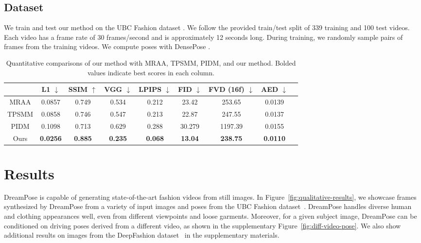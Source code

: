     \subsection{Dataset}

    We train and test our method on the UBC Fashion dataset \cite{ubc_fashion}. We follow the provided train/test split of 339 training and 100 test videos. Each video has a frame rate of 30 frames/second and is approximately 12 seconds long. During training, we randomly sample pairs of frames from the training videos. We compute poses with DensePose \cite{densepose}.
        

        \begin{table*}[h!]
        \begin{center}
        \begin{tabular}{c c c c c c c c c}
        \hline
        & L1 $\downarrow$ & SSIM $\uparrow$ & VGG  $\downarrow$ & LPIPS  $\downarrow$ & FID $\downarrow$ & FVD (16f) $\downarrow$ & AED $\downarrow$ \\
        \hline\hline
        MRAA \cite{articulated_animation} &  0.0857 &  0.749 & 0.534 & 0.212 & 23.42 & 253.65 & 0.0139  \\
        TPSMM \cite{thin_plate_spline}  &  0.0858 & 0.746 & 0.547 & 0.213 & 22.87 & 247.55 & 0.0137 \\
        PIDM \cite{pose-transfer-dm} & 0.1098 & 0.713 & 0.629 & 0.288 & 30.279 & 1197.39 & 0.0155 \\
        Ours & \textbf{0.0256} & \textbf{0.885} & \textbf{0.235} & \textbf{0.068} & \textbf{13.04} & \textbf{238.75} & \textbf{0.0110}  \\
        \hline
        \end{tabular}
        \end{center}
        \caption{Quantitative comparisons of our method with MRAA, TPSMM, PIDM, and our method. Bolded values indicate best scores in each column. %
        }
        \label{quantitative-comparison}
        \end{table*}
\section{Results}
    DreamPose is capable of generating state-of-the-art fashion videos from still images. In Figure~\ref{fig:qualitative-results}, we showcase frames synthesized by DreamPose from a variety of input images and poses from the UBC Fashion dataset~\cite{ubc_fashion}. DreamPose handles diverse human and clothing appearances well, even from different viewpoints and loose garments. Moreover, for a given subject image, DreamPose can be conditioned on driving poses derived from a different video, as shown in the supplementary Figure~\ref{fig:diff-video-pose}. We also show additional results on images from the DeepFashion dataset~\cite{deep-fashion} in the supplementary materials.


